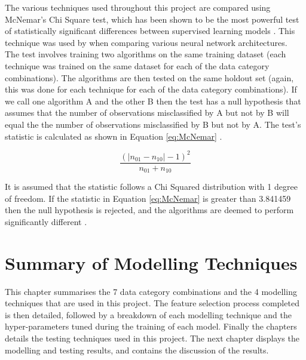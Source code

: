 The various techniques used throughout this project are compared using McNemar's Chi Square test, which has been shown to be the most powerful test of statistically significant differences between supervised learning models \parencite{Test}. This technique was used by \textcite{NNWest} when comparing various neural network architectures.  \\

The test involves training two algorithms on the same training dataset (each technique was trained on the same dataset for each of the data category combinations). The algorithms are then tested on the same holdout set (again, this was done for each technique for each of the data category combinations). If we call one algorithm A and the other B then the test has a null hypothesis that assumes that the number of observations misclassified by A but not by B will equal the the number of observations misclassified by B but not by A. The test's statistic is calculated as shown in Equation \ref{eq:McNemar} \parencite{Test}.


\vspace{10pt}

\begin{equation} \label{eq:McNemar}
\dfrac{(|n_{01}-n_{10}|-1)^2}{n_{01}+n_{10}}
\end{equation}

\vspace{10pt}

It is assumed that the statistic follows a Chi Squared distribution with 1 degree of freedom. If the statistic in Equation \ref{eq:McNemar} is greater than 3.841459 then the null hypothesis is rejected, and the algorithms are deemed to perform significantly different \parencite{Test}. 


\section{Summary of Modelling Techniques}

This chapter summarises the 7 data category combinations and the 4 modelling techniques that are used in this project. The feature selection process completed is then detailed, followed by a breakdown of each modelling technique and the hyper-parameters tuned during the training of each model. Finally the chapters details the testing techniques used in this project. The next chapter displays the modelling and testing results, and contains the discussion of the results. 